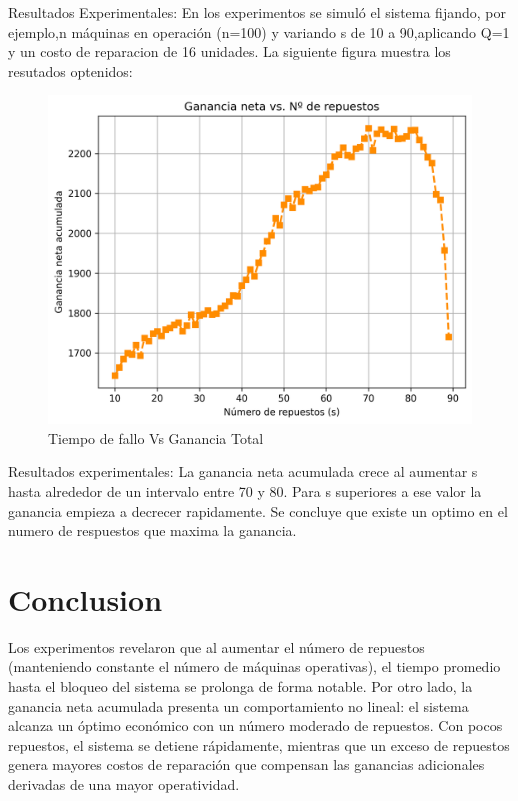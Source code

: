 \documentclass[a4paper,12pt]{article}
\begin{document}
		Resultados Experimentales: En los experimentos se simuló el sistema fijando, por ejemplo,n   máquinas en operación (n=100) y variando s
		de 10 a 90,aplicando Q=1 y un costo de reparacion de 16 unidades. La siguiente figura muestra los resutados optenidos:
		\begin{figure}[H]
			\centering
			\includegraphics[width=\textwidth]{figure2.png}
			\caption{Tiempo de fallo Vs Ganancia Total}
			\label{fig:Tiempo de fallo Vs Ganancia Total}
		\end{figure}
		
		Resultados experimentales: La ganancia neta acumulada crece al aumentar s hasta alrededor de un intervalo entre 70 y 80. Para s superiores a ese valor la ganancia empieza a decrecer rapidamente.
		\newline
		Se concluye que existe un optimo en el numero de respuestos que maxima la ganancia.
		
		\section{Conclusion}
		Los experimentos revelaron que al aumentar el número de repuestos (manteniendo constante el número de máquinas operativas), el tiempo promedio hasta el bloqueo del sistema se prolonga de forma notable.
		Por otro lado, la ganancia neta acumulada presenta un comportamiento no lineal: el sistema alcanza un óptimo económico con un número moderado de repuestos. Con pocos repuestos, el sistema se detiene rápidamente, mientras que un exceso de repuestos genera mayores costos de reparación que compensan las ganancias adicionales derivadas de una mayor operatividad.
			
	
\end{document}
